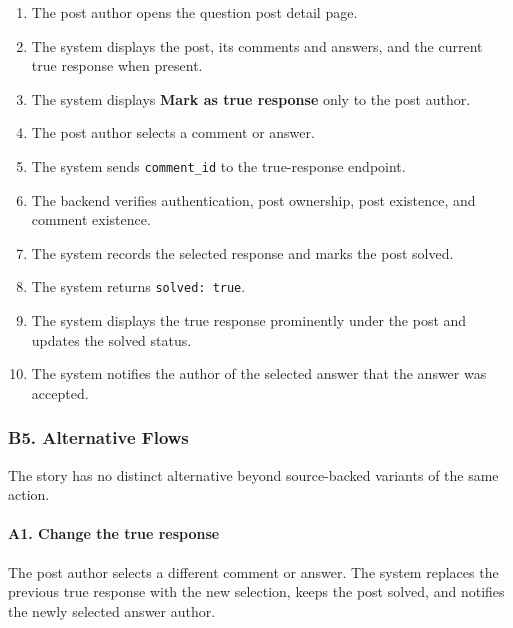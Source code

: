 \documentclass[12pt]{article}
\begin{document}
\begin{enumerate}
\item The post author opens the question post detail page.
\item The system displays the post, its comments and answers, and the current true response when present.
\item The system displays \textbf{Mark as true response} only to the post author.
\item The post author selects a comment or answer.
\item The system sends \texttt{comment\_id} to the true-response endpoint.
\item The backend verifies authentication, post ownership, post existence, and comment existence.
\item The system records the selected response and marks the post solved.
\item The system returns \texttt{solved: true}.
\item The system displays the true response prominently under the post and updates the solved status.
\item The system notifies the author of the selected answer that the answer was accepted.
\end{enumerate}
\par\medskip

\hypertarget{sec:b5-alternative-flows}{}
\subsubsection*{B5. Alternative Flows}
\par\medskip

The story has no distinct alternative beyond source-backed variants of the same action.
\par\medskip

\hypertarget{sec:a1-change-the-true-response}{}
\paragraph*{A1. Change the true response}
\par\medskip

The post author selects a different comment or answer. The system replaces the previous true response with the new selection, keeps the post solved, and notifies the newly selected answer author.
\par\medskip
\end{document}
